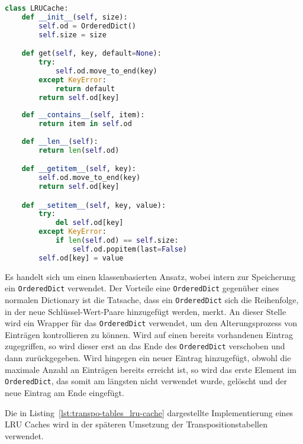\bigskip

\begin{lstlisting}[caption={Implementierung eines LRU Caches}, captionpos=b, label={lst:transpo-tables_lru-cache}, language=Python]
class LRUCache:
    def __init__(self, size):
        self.od = OrderedDict()
        self.size = size

    def get(self, key, default=None):
        try:
            self.od.move_to_end(key)
        except KeyError:
            return default
        return self.od[key]
    
    def __contains__(self, item):
        return item in self.od
    
    def __len__(self):
        return len(self.od)

    def __getitem__(self, key):
        self.od.move_to_end(key)
        return self.od[key]

    def __setitem__(self, key, value):
        try:
            del self.od[key]
        except KeyError:
            if len(self.od) == self.size:
                self.od.popitem(last=False)
        self.od[key] = value
\end{lstlisting}

\noindent Es handelt sich um einen klassenbasierten Ansatz, wobei intern zur Speicherung ein \lstinline[language=Python]{OrderedDict} verwendet.
Der Vorteile eine \lstinline[language=Python]{OrderedDict} gegenüber eines normalen Dictionary ist die Tatsache, dass ein \lstinline[language=Python]{OrderedDict} sich die Reihenfolge, in der neue Schlüssel-Wert-Paare hinzugefügt werden, merkt.
An dieser Stelle wird ein Wrapper für das \lstinline[language=Python]{OrderedDict} verwendet, um den Alterungsprozess von Einträgen kontrollieren zu können.
Wird auf einen bereits vorhandenen Eintrag zugegriffen, so wird dieser erst an das Ende des \lstinline[language=Python]{OrderedDict} verschoben und dann zurückgegeben.
Wird hingegen ein neuer Eintrag hinzugefügt, obwohl die maximale Anzahl an Einträgen bereits erreicht ist, so wird das erste Element im \lstinline[language=Python]{OrderedDict}, das somit am längsten nicht verwendet wurde, gelöscht und der neue Eintrag am Ende eingefügt.

Die in Listing~\ref{lst:transpo-tables_lru-cache} dargestellte Implementierung eines \ac{LRU} Caches wird in der späteren Umsetzung der Transpositionstabellen verwendet.
